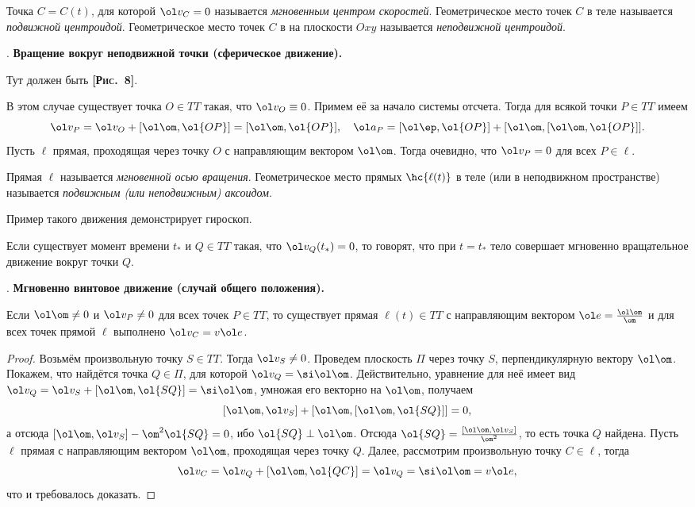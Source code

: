 \documentclass[a4paper,12pt]{article}
\def\w{\ol\om}
\def\a{\ol a}
\def\v{\ol v}
\def\e{\ol e}
\def\vep{\ol\ep}
\def\pic#1{ \hbox{\textbf{\textsc{[Рис.~#1]}}}}
\begin{document}
\begin{df}
Точка $C=C(t)$, для которой $\v_C = 0$ называется \emph{мгновенным центром скоростей}.
Геометрическое место точек $C$ в теле называется \emph{подвижной центроидой}.
Геометрическое место точек $C$ в на плоскости $Oxy$
называется \emph{неподвижной центроидой}.
\end{df}

\medskip

. \textbf{Вращение вокруг неподвижной точки (сферическое  движение).}

Тут должен быть \pic{8}.

В этом случае существует точка $O\in TT$ такая, что $\v_O\equiv 0$.
Примем её за начало системы отсчета.
Тогда для всякой точки $P \in TT$ имеем
$$\v_P=\v_O + [\w,\ol{OP}] = [\w,\ol{OP}],\quad
\a_P=[\vep,\ol{OP}]+[\w,[\w,\ol{OP}]].$$
Пусть $\ell$ прямая, проходящая через точку $O$ с направляющим вектором $\w$.
Тогда очевидно, что $\v_P=0$ для всех $P\in \ell$.

\begin{df}
Прямая $\ell$ называется \emph{мгновенной осью вращения}.
Геометрическое место прямых $\hc{\ell(t)}$ в теле (или в неподвижном
пространстве) называется \emph{подвижным (или неподвижным) аксоидом}.
\end{df}

Пример такого движения демонстрирует гироскоп.

\begin{df}
Если существует момент времени $t_*$ и $Q\in TT$ такая, что
$\v_Q(t_*)=0$, то говорят, что при $t=t_*$ тело совершает мгновенно
вращательное движение вокруг точки $Q$.
\end{df}

\medskip

. \textbf{Мгновенно винтовое движение (случай общего положения).}

\begin{stm}
Если $\w\ne0$ и $\v_P\ne0$ для всех точек $P\in TT$, то существует
прямая $\ell(t)\in TT$ с направляющим вектором $\e = \frac{\w}{\om}$ и
для всех точек прямой $\ell$ выполнено $\v_C=v\e$.
\end{stm}

\begin{proof}
Возьмём произвольную точку $S\in TT$. Тогда $\v_S\ne 0$.
Проведем плоскость $\Pi$ через точку $S$, перпендикулярную вектору $\w$.
Покажем, что найдётся точка $Q\in\Pi$, для которой $\v_Q=\si\w$.
Действительно, уравнение для неё имеет вид $\v_Q=\v_S+[\w,\ol{SQ}]=\si\w$,
умножая его векторно на $\w$, получаем
$$[\w,\v_S]+[\w,[\w,\ol{SQ}]]=0,$$
а отсюда
$[\w,\v_S]-\om^2\ol{SQ}=0$, ибо $\ol{SQ}\perp\w$.
Отсюда $\ol{SQ}=\frac{[\w,\v_S]}{\om^2}$, то есть точка $Q$ найдена.
Пусть $\ell$ прямая с направляющим вектором $\w$, проходящая через точку $Q$.
Далее, рассмотрим произвольную точку $C \in \ell$, тогда
$$
\v_C=\v_Q+[\w,\ol{QC}]=\v_Q = \si\w = v\e,
$$
что и требовалось доказать.
\end{proof}
\end{document}
